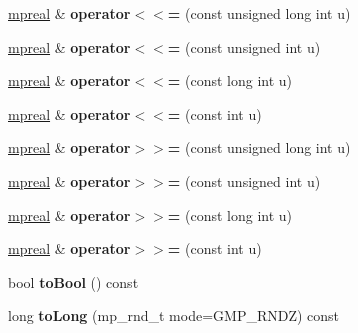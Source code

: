 \begin{DoxyCompactItemize}
\hyperlink{classmpfr_1_1mpreal}{mpreal} \& {\bfseries operator$<$$<$=} (const unsigned long int u)
\item 
\mbox{\label{classmpfr_1_1mpreal_a961b4d9199f42aaf41e2da287664ca98}} 
\hyperlink{classmpfr_1_1mpreal}{mpreal} \& {\bfseries operator$<$$<$=} (const unsigned int u)
\item 
\mbox{\label{classmpfr_1_1mpreal_aa79c9ddda376ecd804fa5ca97c44f568}} 
\hyperlink{classmpfr_1_1mpreal}{mpreal} \& {\bfseries operator$<$$<$=} (const long int u)
\item 
\mbox{\label{classmpfr_1_1mpreal_affc87cc39468cd2777c57d1402e69b12}} 
\hyperlink{classmpfr_1_1mpreal}{mpreal} \& {\bfseries operator$<$$<$=} (const int u)
\item 
\mbox{\label{classmpfr_1_1mpreal_a7091280a4eb2278a6b13e41f7e05ccbf}} 
\hyperlink{classmpfr_1_1mpreal}{mpreal} \& {\bfseries operator$>$$>$=} (const unsigned long int u)
\item 
\mbox{\label{classmpfr_1_1mpreal_ae588196811bc2d0c64893fbb153bb060}} 
\hyperlink{classmpfr_1_1mpreal}{mpreal} \& {\bfseries operator$>$$>$=} (const unsigned int u)
\item 
\mbox{\label{classmpfr_1_1mpreal_a1e1b279915a57320dfca4299a40d1381}} 
\hyperlink{classmpfr_1_1mpreal}{mpreal} \& {\bfseries operator$>$$>$=} (const long int u)
\item 
\mbox{\label{classmpfr_1_1mpreal_a2182af5564600fa7bbec90dff97fb7f5}} 
\hyperlink{classmpfr_1_1mpreal}{mpreal} \& {\bfseries operator$>$$>$=} (const int u)
\item 
\mbox{\label{classmpfr_1_1mpreal_a8668c7c60f1060a9c35cebc1f818e516}} 
bool {\bfseries to\+Bool} () const
\item 
\mbox{\label{classmpfr_1_1mpreal_a4f3de2ed6629255ee7fb5e3ed9ad50e2}} 
long {\bfseries to\+Long} (mp\+\_\+rnd\+\_\+t mode=G\+M\+P\+\_\+\+R\+N\+DZ) const
\item 
\mbox{\label{classmpfr_1_1mpreal_a283bb8637d725d59ea1b3e2c7159ef8b}} 

\end{DoxyCompactItemize}
